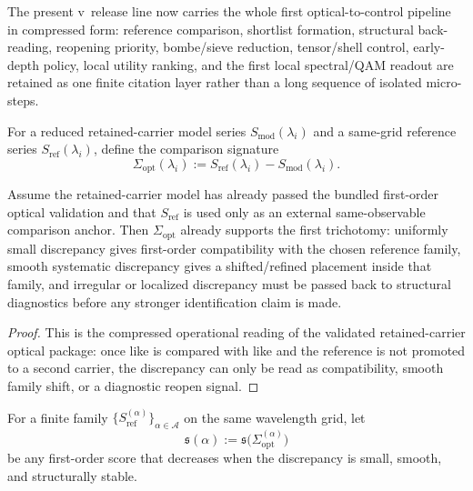 \begin{remark}
\label{rem:status-of-the-compressed-optical-diagnostic-control-layer-in-v324}
The present v\docversion\ release line now carries the whole first optical-to-control pipeline in compressed form: reference comparison, shortlist formation, structural back-reading, reopening priority, bombe/sieve reduction, tensor/shell control, early-depth policy, local utility ranking, and the first local spectral/QAM readout are retained as one finite citation layer rather than a long sequence of isolated micro-steps.
\end{remark}

\begin{definition}
\label{def:reference-comparison-optical-signature}
For a reduced retained-carrier model series $S_{\mathrm{mod}}(\lambda_i)$ and a same-grid reference series $S_{\mathrm{ref}}(\lambda_i)$, define the comparison signature
\[
\Sigma_{\mathrm{opt}}(\lambda_i):=S_{\mathrm{ref}}(\lambda_i)-S_{\mathrm{mod}}(\lambda_i).
\]
\end{definition}

\begin{proposition}
\label{prop:first-data-anchored-optical-comparison-principle}
Assume the retained-carrier model has already passed the bundled first-order optical validation and that $S_{\mathrm{ref}}$ is used only as an external same-observable comparison anchor. Then $\Sigma_{\mathrm{opt}}$ already supports the first trichotomy: uniformly small discrepancy gives first-order compatibility with the chosen reference family, smooth systematic discrepancy gives a shifted/refined placement inside that family, and irregular or localized discrepancy must be passed back to structural diagnostics before any stronger identification claim is made.
\end{proposition}

\begin{proof}
This is the compressed operational reading of the validated retained-carrier optical package: once like is compared with like and the reference is not promoted to a second carrier, the discrepancy can only be read as compatibility, smooth family shift, or a diagnostic reopen signal.
\end{proof}

\begin{definition}
\label{def:reference-family-comparison-score}
For a finite family $\{S_{\mathrm{ref}}^{(\alpha)}\}_{\alpha\in\mathcal A}$ on the same wavelength grid, let
\[
\mathfrak s(\alpha):=\mathfrak s\bigl(\Sigma^{(\alpha)}_{\mathrm{opt}}\bigr)
\]
be any first-order score that decreases when the discrepancy is small, smooth, and structurally stable.
\end{definition}

